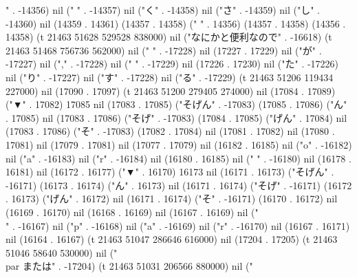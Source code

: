 " . -14356) nil (" " . -14357) nil ("く" . -14358) nil ("さ" . -14359) nil ("し" . -14360) nil (14359 . 14361) (14357 . 14358) (" " . 14356) (14357 . 14358) (14356 . 14358) (t 21463 51628 529528 838000) nil ("なにかと便利なので" . -16618) (t 21463 51468 756736 562000) nil (" " . -17228) nil (17227 . 17229) nil ("が" . -17227) nil ("," . -17228) nil (" " . -17229) nil (17226 . 17230) nil ("た" . -17226) nil ("り" . -17227) nil ("す" . -17228) nil ("る" . -17229) (t 21463 51206 119434 227000) nil (17090 . 17097) (t 21463 51200 279405 274000) nil (17084 . 17089) ("▼" . 17082) 17085 nil (17083 . 17085) ("そげん" . -17083) (17085 . 17086) ("ん" . 17085) nil (17083 . 17086) ("そげ" . -17083) (17084 . 17085) ("げん" . 17084) nil (17083 . 17086) ("そ" . -17083) (17082 . 17084) nil (17081 . 17082) nil (17080 . 17081) nil (17079 . 17081) nil (17077 . 17079) nil (16182 . 16185) nil ("o" . -16182) nil ("a" . -16183) nil ("r" . -16184) nil (16180 . 16185) nil (" " . -16180) nil (16178 . 16181) nil (16172 . 16177) ("▼" . 16170) 16173 nil (16171 . 16173) ("そげん" . -16171) (16173 . 16174) ("ん" . 16173) nil (16171 . 16174) ("そげ" . -16171) (16172 . 16173) ("げん" . 16172) nil (16171 . 16174) ("そ" . -16171) (16170 . 16172) nil (16169 . 16170) nil (16168 . 16169) nil (16167 . 16169) nil ("\\" . -16167) nil ("p" . -16168) nil ("a" . -16169) nil ("r" . -16170) nil (16167 . 16171) nil (16164 . 16167) (t 21463 51047 286646 616000) nil (17204 . 17205) (t 21463 51046 58640 530000) nil (" \\par または" . -17204) (t 21463 51031 206566 880000) nil ("

